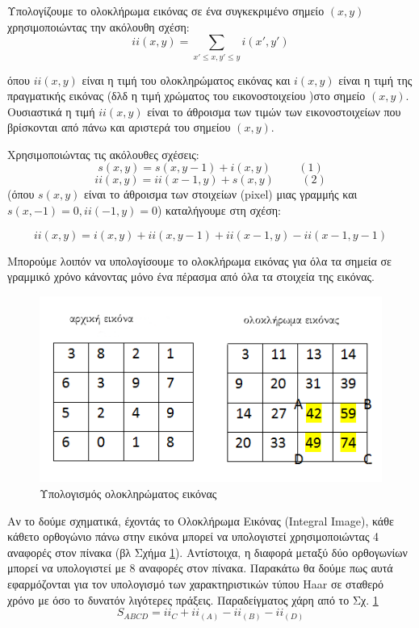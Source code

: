 Υπολογίζουμε το ολοκλήρωμα εικόνας σε ένα συγκεκριμένο σημείο $(x,y)$
χρησιμοποιώντας την ακόλουθη σχέση:
$$
ii(x,y) = \displaystyle\sum_{x'\leq x, y'\leq y} i(x',y')
$$

όπου $ii(x,y)$ είναι η τιμή του ολοκληρώματος εικόνας και $i(x,y)$ είναι η τιμή
της πραγματικής εικόνας (δλδ η τιμή χρώματος του εικονοστοιχείου )στο σημείο $(x,y)$.
Ουσιαστικά η τιμή $ii(x,y)$ είναι το άθροισμα των τιμών των εικονοστοιχείων που
βρίσκονται από πάνω και αριστερά του σημείου $(x,y)$.

Χρησιμοποιώντας τις ακόλουθες σχέσεις:
$$
s(x,y) = s(x,y-1) + i(x,y) \hspace{1cm} (1)
$$
$$
ii(x,y) = ii(x-1,y) + s(x,y) \hspace{1cm} (2)
$$
(όπου $s(x,y)$ είναι το άθροισμα των στοιχείων (pixel) μιας γραμμής και $s(x, -1)=0, ii(-1,y)=0$)
καταλήγουμε στη σχέση:

$$
ii(x,y) = i(x,y) + ii(x,y-1) + ii(x-1,y) - ii(x-1,y-1)
$$

Μπορούμε λοιπόν να υπολογίσουμε το ολοκλήρωμα εικόνας για όλα τα σημεία σε γραμμικό
χρόνο κάνοντας μόνο ένα πέρασμα από όλα τα στοιχεία της εικόνας.

\begin{figure}[htbp]
  \begin{center}
    \includegraphics[width=1.0\maxwidth]{../figures/integrimgr3.png}
    \caption{Υπολογισμός ολοκληρώματος εικόνας\label{fig:integrimg}}
   \end{center}
\end{figure}


Αν το δούμε σχηματικά, έχοντάς το Ολοκλήρωμα Εικόνας (Integral Image), κάθε κάθετο ορθογώνιο
πάνω στην εικόνα μπορεί να υπολογιστεί χρησιμοποιώντας
4 αναφορές στον πίνακα (βλ Σχήμα \ref{fig:integrimg}). Αντίστοιχα, η διαφορά μεταξύ
δύο ορθογωνίων μπορεί να υπολογιστεί με 8 αναφορές στον πίνακα. Παρακάτω θα δούμε
πως αυτά εφαρμόζονται για τον υπολογισμό των χαρακτηριστικών τύπου Haar σε σταθερό
χρόνο με όσο το δυνατόν λιγότερες πράξεις. Παραδείγματος χάρη από το Σχ. \ref{fig:integrimg}
$$
S_{ABCD} = ii_{C} + ii_(A) - ii_(B) - ii_(D)
$$

